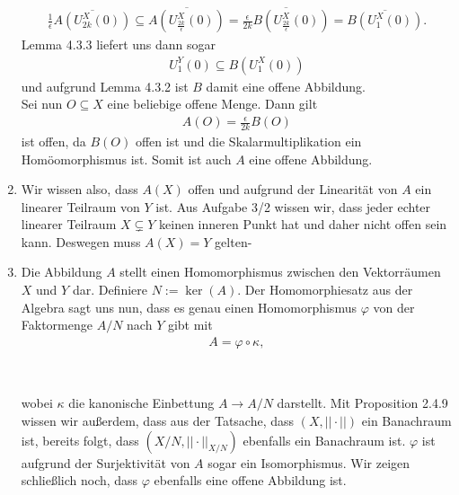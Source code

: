\begin{solution}
\begin{enumerate}[label = (\roman*)]
\begin{align*}
    \frac{1}{\epsilon} \overline{A(U_{2k}^X(0))}
    \subseteq \overline{A(U_{\frac{2k}{\epsilon}}^X(0))}
    = \overline{\frac{\epsilon}{2k}B(U_{\frac{2k}{\epsilon}}^X(0))}
    = \overline{B(U_{1}^X(0))}.
  \end{align*}
  Lemma 4.3.3 liefert uns dann sogar
  \begin{align*}
    U_1^Y(0) \subseteq B(U_{1}^X(0))
  \end{align*}
  und aufgrund Lemma 4.3.2 ist $B$ damit eine offene Abbildung. \\
  Sei nun $O \subseteq X$ eine beliebige offene Menge. Dann gilt
  \begin{align*}
    A(O) = \frac{\epsilon}{2k}B(O)
  \end{align*}
  ist offen, da $B(O)$ offen ist und die Skalarmultiplikation ein Homöomorphismus ist.
  Somit ist auch $A$ eine offene Abbildung.
  \item Wir wissen also, dass $A(X)$ offen und aufgrund der Linearität von $A$
  ein linearer Teilraum von $Y$ ist. Aus Aufgabe 3/2 wissen wir, dass
  jeder echter linearer Teilraum $X \subsetneq Y$ keinen inneren Punkt hat und
  daher nicht offen sein kann. Deswegen muss $A(X) = Y$ gelten-
  \item Die Abbildung $A$ stellt einen Homomorphismus zwischen den Vektorräumen
  $X$ und $Y$ dar. Definiere $N := \ker(A)$. Der Homomorphiesatz aus der Algebra
  sagt uns nun, dass es genau einen Homomorphismus $\varphi$ von der Faktormenge $A/N$
  nach $Y$ gibt mit
  \begin{align*}
    A = \varphi \circ \kappa,
  \end{align*}
  \begin{center}
   \\
  \end{center}
  wobei $\kappa$ die kanonische Einbettung $A \rightarrow A/N$ darstellt.
  Mit Proposition 2.4.9 wissen wir außerdem, dass aus der Tatsache, dass $(X,||\cdot||)$
  ein Banachraum ist, bereits folgt, dass $(X/N, ||\cdot||_{X/N})$ ebenfalls ein
  Banachraum ist. $\varphi$ ist aufgrund der Surjektivität von $A$ sogar ein
  Isomorphismus. Wir zeigen schließlich noch, dass $\varphi$ ebenfalls eine offene Abbildung ist.

\end{enumerate}
\end{solution}
